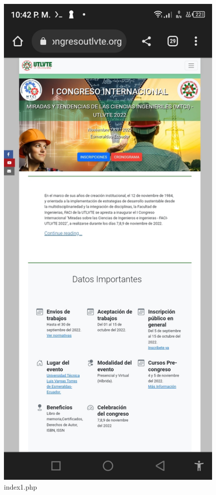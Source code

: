 \documentclass[a4paper,14px]{article}
\begin{document}
\begin{minipage}[H]{0.45\linewidth}
\begin{figure}[H]
  \centering
  \includegraphics[scale=0.3]{index1.jpg}
  \caption{index1.php }
  \label{fig:arquitectura1}
\end{figure}
  
\end{minipage}
\end{document}
